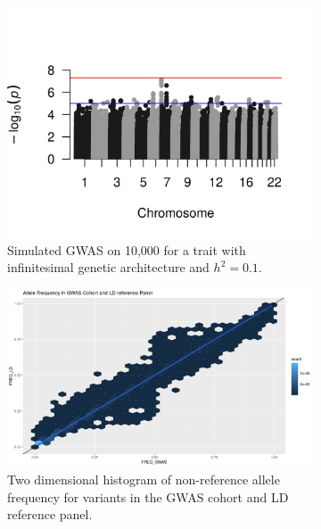 \begin{figure}
  \centering
  \begin{subfigure}[t]{\textwidth}
    \centering
    \includegraphics[width=\linewidth]{img/rssp_01.png}
    \caption{Simulated GWAS on 10,000 for a trait with infinitesimal genetic architecture and $h^2=0.1$.  }\label{fig:gwas_01}
  \end{subfigure}
    \begin{subfigure}[t]{\textwidth}
    \centering
    \includegraphics[width=\linewidth]{img/Allele_freq_match.png}
    \caption{Two dimensional histogram of non-reference allele frequency for variants in the GWAS cohort and LD reference panel.}\label{fig:gwas_01}
  \end{subfigure}
  \vspace{1cm}
  \begin{subfigure}[t]{\textwidth}
    \centering

\end{subfigure}
\end{figure}
